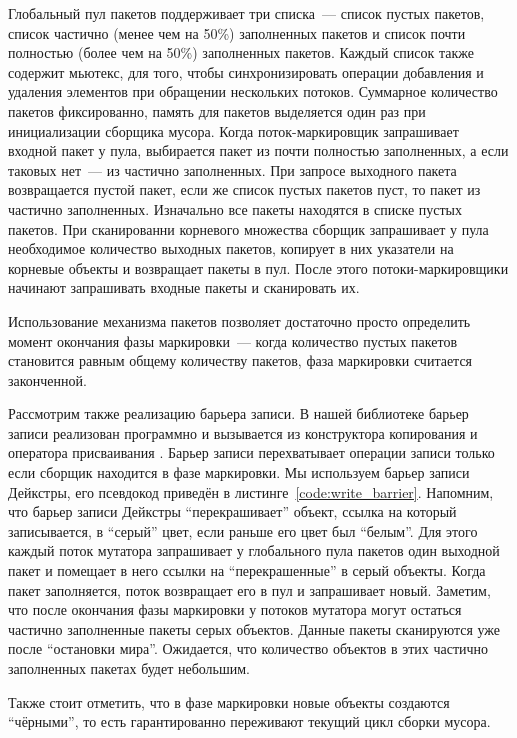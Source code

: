 Глобальный пул пакетов поддерживает три списка~--- список пустых пакетов, 
список частично (менее чем на 50\%) заполненных пакетов и список почти полностью 
(более чем на 50\%) заполненных пакетов. 
Каждый список также содержит мьютекс, для того, чтобы синхронизировать операции добавления 
и удаления элементов при обращении нескольких потоков. 
Суммарное количество пакетов фиксированно, память для пакетов выделяется один раз 
при инициализации сборщика мусора. 
Когда поток-маркировщик запрашивает входной пакет у пула, выбирается пакет из почти 
полностью заполненных, а если таковых нет~--- из частично заполненных. 
При запросе выходного пакета возвращается пустой пакет, если же список пустых пакетов пуст, 
то пакет из частично заполненных. 
Изначально все пакеты находятся в списке пустых пакетов. 
При сканированни корневого множества сборщик запрашивает у пула необходимое количество 
выходных пакетов, копирует в них указатели на корневые объекты и возвращает пакеты в пул. 
После этого потоки-маркировщики начинают запрашивать входные пакеты и сканировать их. 

Использование механизма пакетов позволяет достаточно просто определить момент окончания 
фазы маркировки~--- когда количество пустых пакетов становится равным общему количеству 
пакетов, фаза маркировки считается законченной. 

Рассмотрим также реализацию барьера записи. 
В нашей библиотеке барьер записи реализован программно и вызывается из конструктора 
копирования и оператора присваивания . 
Барьер записи перехватывает операции записи только если сборщик находится в фазе маркировки. 
Мы используем барьер записи Дейкстры, его псевдокод приведён в листинге~\ref{code:write_barrier}. 
Напомним, что барьер записи Дейкстры ``перекрашивает'' объект, ссылка на который записывается, 
в ``серый'' цвет, если раньше его цвет был ``белым''. 
Для этого каждый поток мутатора запрашивает у глобального пула пакетов один выходной пакет 
и помещает в него ссылки на ``перекрашенные'' в серый объекты. 
Когда пакет заполняется, поток возвращает его в пул и запрашивает новый. 
Заметим, что после окончания фазы маркировки у потоков мутатора могут остаться частично 
заполненные пакеты серых объектов. 
Данные пакеты сканируются уже после ``остановки мира''. 
Ожидается, что количество объектов в этих частично заполненных пакетах будет небольшим.

Также стоит отметить, что в фазе маркировки новые объекты создаются ``чёрными'', 
то есть гарантированно переживают текущий цикл сборки мусора.

